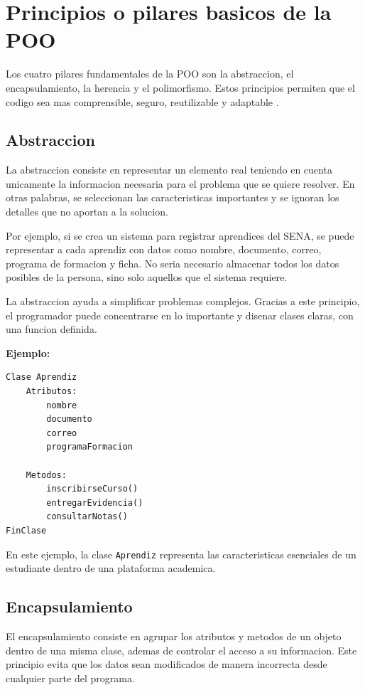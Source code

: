 \documentclass[12pt,letterpaper]{article}
\begin{document}
\section{Principios o pilares basicos de la POO}

Los cuatro pilares fundamentales de la POO son la abstraccion, el encapsulamiento, la herencia y el polimorfismo. Estos principios permiten que el codigo sea mas comprensible, seguro, reutilizable y adaptable \parencite{scieloPOO,unamPOO}.

\subsection{Abstraccion}

La abstraccion consiste en representar un elemento real teniendo en cuenta unicamente la informacion necesaria para el problema que se quiere resolver. En otras palabras, se seleccionan las caracteristicas importantes y se ignoran los detalles que no aportan a la solucion.

Por ejemplo, si se crea un sistema para registrar aprendices del SENA, se puede representar a cada aprendiz con datos como nombre, documento, correo, programa de formacion y ficha. No seria necesario almacenar todos los datos posibles de la persona, sino solo aquellos que el sistema requiere.

La abstraccion ayuda a simplificar problemas complejos. Gracias a este principio, el programador puede concentrarse en lo importante y disenar clases claras, con una funcion definida.

\textbf{Ejemplo:}

\begin{lstlisting}
Clase Aprendiz
    Atributos:
        nombre
        documento
        correo
        programaFormacion

    Metodos:
        inscribirseCurso()
        entregarEvidencia()
        consultarNotas()
FinClase
\end{lstlisting}

En este ejemplo, la clase \texttt{Aprendiz} representa las caracteristicas esenciales de un estudiante dentro de una plataforma academica.

\subsection{Encapsulamiento}

El encapsulamiento consiste en agrupar los atributos y metodos de un objeto dentro de una misma clase, ademas de controlar el acceso a su informacion. Este principio evita que los datos sean modificados de manera incorrecta desde cualquier parte del programa.
\end{document}
